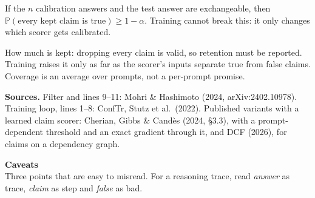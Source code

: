 \documentclass[10pt,a4paper]{article}
\newcommand{\PP}{\mathbb{P}}
\newcommand{\ths}{\theta^\star}
\begin{document}
\vspace{3pt}
\begin{minipage}[t]{0.492\linewidth}
\small
\begin{okbox}[Guaranteed, for any $\ths$]
If the $n$ calibration answers and the test answer are exchangeable, then $\PP(\text{every kept claim is true})\ge 1-\alpha$. Training cannot break this: it only changes which scorer gets calibrated.
\end{okbox}
\end{minipage}\hfill
\begin{minipage}[t]{0.492\linewidth}
\small
\begin{nobox}
How much is kept: dropping every claim is valid, so retention must be reported. Training raises it only as far as the scorer's inputs separate true from false claims. Coverage is an average over prompts, not a per-prompt promise.
\end{nobox}
\end{minipage}

\vspace{1pt}
{\scriptsize\textcolor{ourfr}{\textbf{Sources.} Filter and lines 9--11: Mohri \& Hashimoto (2024, arXiv:2402.10978). Training loop, lines 1--8: ConfTr, Stutz et al.\ (2022). Published variants with a learned claim scorer: Cherian, Gibbs \& Cand\`es (2024, \S3.3), with a prompt-dependent threshold and an exact gradient through it, and DCF (2026), for claims on a dependency graph.}\par}

\newpage
{\Large\bfseries\color{secblue} Caveats}\\[1pt]
{\small\textcolor{ourfr}{Three points that are easy to misread. For a reasoning trace, read \emph{answer} as trace, \emph{claim} as step and \emph{false} as bad.}}
\end{document}
